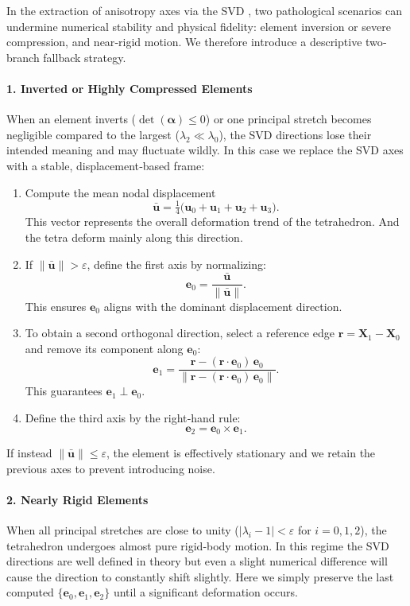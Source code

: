 \documentclass{article}
\begin{document}
In the extraction of anisotropy axes via the SVD , two pathological scenarios can undermine
numerical stability and physical fidelity: element inversion or severe compression, and near‐rigid motion.  
We therefore introduce a descriptive two‐branch fallback strategy.

\paragraph{1. Inverted or Highly Compressed Elements}

When an element inverts (\(\det(\mathbf \alpha)\le0\)) or one principal stretch becomes negligible 
compared to the largest (\(\lambda_{2}\ll\lambda_{0}\)), 
the SVD directions lose their intended meaning and may fluctuate wildly.  
In this case we replace the SVD axes with a stable, displacement‐based frame:

\begin{enumerate}
  \item Compute the mean nodal displacement
    \[
      \bar{\mathbf u}
      = \tfrac{1}{4}\bigl(\mathbf u_{0} + \mathbf u_{1} + \mathbf u_{2} + \mathbf u_{3}\bigr).
    \]
    This vector represents the overall deformation trend of the tetrahedron.
    And the tetra deform mainly along this direction.
  \item If \(\|\bar{\mathbf u}\|>\varepsilon\), define the first axis by normalizing:
    \[
      \mathbf e_{0}
      = \frac{\bar{\mathbf u}}{\|\bar{\mathbf u}\|}.
    \]
    This ensures \(\mathbf e_{0}\) aligns with the dominant displacement direction.
  \item To obtain a second orthogonal direction, select a reference edge \(\mathbf r = \mathbf X_{1}-\mathbf X_{0}\) and remove its component along \(\mathbf e_{0}\):
    \[
      \mathbf e_{1}
      = \frac{\mathbf r - (\mathbf r\cdot\mathbf e_{0})\,\mathbf e_{0}}
             {\bigl\|\mathbf r - (\mathbf r\cdot\mathbf e_{0})\,\mathbf e_{0}\bigr\|}.
    \]
    This guarantees \(\mathbf e_{1}\perp\mathbf e_{0}\).
  \item Define the third axis by the right‐hand rule:
    \[
      \mathbf e_{2} = \mathbf e_{0}\times \mathbf e_{1}.
    \]
\end{enumerate}
If instead \(\|\bar{\mathbf u}\|\le\varepsilon\), the element is effectively stationary and we retain the previous axes to prevent introducing noise.

\paragraph{2. Nearly Rigid Elements}  
When all principal stretches are close to unity (\(\lvert\lambda_{i}-1\rvert<\varepsilon\) for \(i=0,1,2\)), 
the tetrahedron undergoes almost pure rigid‐body motion.  
In this regime the SVD directions are well defined in theory 
but even a slight numerical difference will cause the direction to constantly shift slightly.
Here we simply preserve the last computed 
\(\{\mathbf e_{0},\mathbf e_{1},\mathbf e_{2}\}\) until a significant deformation occurs.
\end{document}
